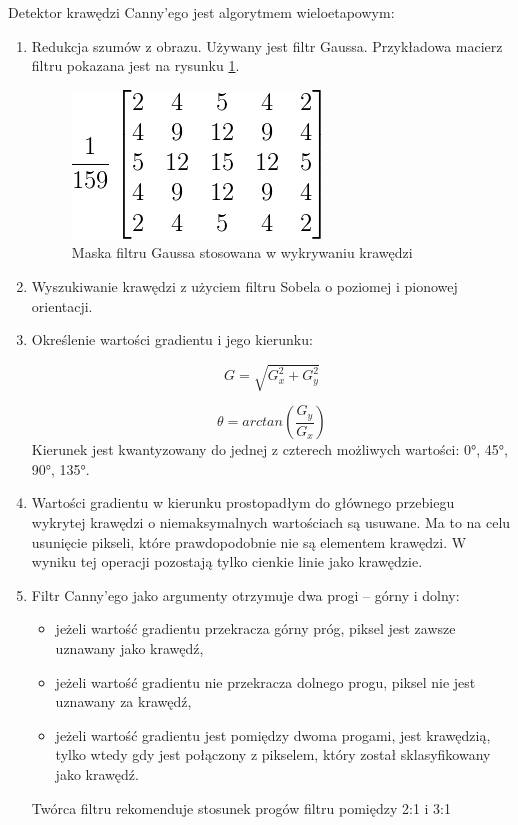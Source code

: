 Detektor krawędzi Canny'ego jest algorytmem wieloetapowym:
\begin{enumerate}
\item Redukcja szumów z obrazu. Używany jest filtr Gaussa. Przykładowa macierz filtru pokazana jest na rysunku \ref{fig:canny_gauss}.
\begin{figure}[h]
\centering
\includegraphics[scale=0.8]{img/canny_gauss.png}
\caption{Maska filtru Gaussa stosowana w wykrywaniu krawędzi}
\label{fig:canny_gauss}
\end{figure}
\item Wyszukiwanie krawędzi z użyciem filtru Sobela o poziomej i pionowej orientacji.
\item Określenie wartości gradientu i jego kierunku:

\begin{equation}
G=\sqrt{G_x^2+G_y^2}
\end{equation}

\begin{equation}
\theta=arctan(\frac{G_y}{G_x})
\end{equation}
Kierunek jest kwantyzowany do jednej z czterech możliwych wartości: \ang{0}, \ang{45}, \ang{90}, \ang{135}.


\item Wartości gradientu w kierunku prostopadłym do głównego przebiegu wykrytej krawędzi o niemaksymalnych wartościach są usuwane.
Ma to na celu usunięcie pikseli, które prawdopodobnie nie są elementem krawędzi. 
W wyniku tej operacji pozostają tylko cienkie linie jako krawędzie.

\item Filtr Canny'ego jako argumenty otrzymuje dwa progi -- górny i dolny:
\begin{itemize}
\item jeżeli wartość gradientu przekracza górny próg, piksel jest zawsze uznawany jako krawędź,
\item jeżeli wartość gradientu nie przekracza dolnego progu, piksel nie jest uznawany za krawędź,
\item jeżeli wartość gradientu jest pomiędzy dwoma progami, jest krawędzią, tylko wtedy gdy jest połączony z pikselem, który został sklasyfikowany jako krawędź.
\end{itemize}
Twórca filtru rekomenduje stosunek progów filtru pomiędzy 2:1 i 3:1
\end{enumerate}